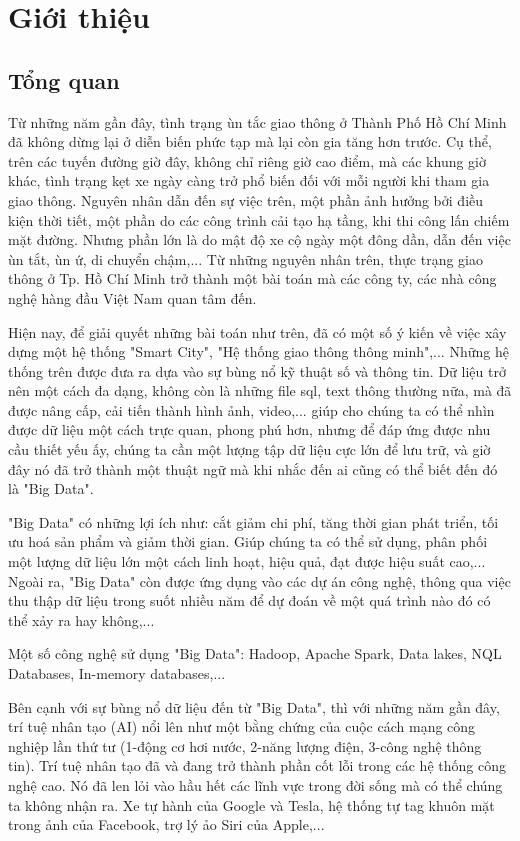 \chapter{Giới thiệu}

\section{Tổng quan}
	Từ những năm gần đây, tình trạng ùn tắc giao thông ở Thành Phố Hồ Chí Minh đã không dừng lại ở diễn biến phức tạp mà lại còn gia tăng hơn trước. Cụ thể, trên các tuyến đường giờ đây, không chỉ riêng giờ cao điểm, mà các khung giờ khác, tình trạng kẹt xe ngày càng trở phổ biến đối với mỗi người khi tham gia giao thông. Nguyên nhân dẫn đến sự việc trên, một phần ảnh hưởng bởi điều kiện thời tiết, một phần do các công trình cải tạo hạ tầng, khi thi công lấn chiếm mặt đường. Nhưng phần lớn là do mật độ xe cộ ngày một đông dần, dẫn đến việc ùn tắt, ùn ứ, di chuyển chậm,... Từ những nguyên nhân trên, thực trạng giao thông ở Tp. Hồ Chí Minh trở thành một bài toán mà các công ty, các nhà công nghệ hàng đầu Việt Nam quan tâm đến.\par
	Hiện nay, để giải quyết những bài toán như trên, đã có một số ý kiến về việc xây dựng một hệ thống "Smart City", "Hệ thống giao thông thông minh",... Những hệ thống trên được đưa ra dựa vào sự bùng nổ kỹ thuật số và thông tin. Dữ liệu trở nên một cách đa dạng, không còn là những file sql, text thông thường nữa, mà đã được nâng cấp, cải tiến thành hình ảnh, video,... giúp cho chúng ta có thể nhìn được dữ liệu một cách trực quan, phong phú hơn, nhưng để đáp ứng được nhu cầu thiết yếu ấy, chúng ta cần một lượng tập dữ liệu cực lớn để lưu trữ, và giờ đây nó đã trở thành một thuật ngữ mà khi nhắc đến ai cũng có thể biết đến đó là "Big Data".\par
"Big Data" có những lợi ích như: cắt giảm chi phí, tăng thời gian phát triển, tối ưu hoá sản phẩm và giảm thời gian. Giúp chúng ta có thể sử dụng, phân phối một lượng dữ liệu lớn một cách linh hoạt, hiệu quả, đạt được hiệu suất cao,... Ngoài ra, "Big Data" còn được ứng dụng vào các dự án công nghệ, thông qua việc thu thập dữ liệu trong suốt nhiều năm để dự đoán về một quá trình nào đó có thể xảy ra hay không,...\par
Một số công nghệ sử dụng "Big Data": Hadoop, Apache Spark, Data lakes, NQL Databases, In-memory databases,...\par
Bên cạnh với sự bùng nổ dữ liệu đến từ "Big Data", thì với những năm gần đây, trí tuệ nhân tạo (AI) nổi lên như một bằng chứng của cuộc cách mạng công nghiệp lần thứ tư (1-động cơ hơi nước, 2-năng lượng điện, 3-công nghệ thông tin). Trí tuệ nhân tạo đã và đang trở thành phần cốt lỗi trong các hệ thống công nghệ cao. Nó đã len lỏi vào hầu hết các lĩnh vực trong đời sống mà có thể chúng ta không nhận ra. Xe tự hành của Google và Tesla, hệ thống tự tag khuôn mặt trong ảnh của Facebook, trợ lý ảo Siri của Apple,...\par
